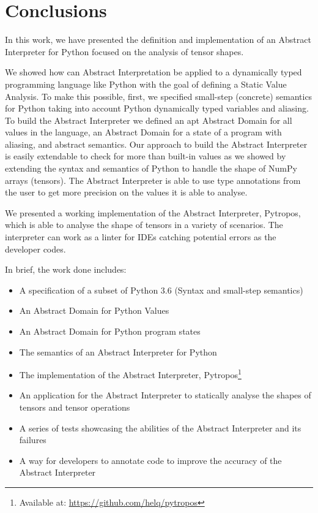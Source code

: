 \chapter{Conclusions}\label{conclusions}

In this work, we have presented the definition and implementation of an Abstract
Interpreter for Python focused on the analysis of tensor shapes.

We showed how can Abstract Interpretation be applied to a dynamically typed programming
language like Python with the goal of defining a Static Value Analysis. To make this
possible, first, we specified small-step (concrete) semantics for Python taking into
account Python dynamically typed variables and aliasing. To build the Abstract Interpreter
we defined an apt Abstract Domain for all values in the language, an Abstract Domain for a
state of a program with aliasing, and abstract semantics. Our approach to build the
Abstract Interpreter is easily extendable to check for more than built-in values as we
showed by extending the syntax and semantics of Python to handle the shape of NumPy arrays
(tensors). The Abstract Interpreter is able to use type annotations from the user to get
more precision on the values it is able to analyse.

We presented a working implementation of the Abstract Interpreter, Pytropos, which is able
to analyse the shape of tensors in a variety of scenarios. The interpreter can work as a
linter for IDEs catching potential errors as the developer codes.

In brief, the work done includes:

\begin{itemize}
\tightlist
\item A specification of a subset of Python 3.6 (Syntax and small-step semantics)
\item An Abstract Domain for Python Values
\item An Abstract Domain for Python program states
\item The semantics of an Abstract Interpreter for Python
\item The implementation of the Abstract Interpreter, Pytropos\footnote{Available at:
    \url{https://github.com/helq/pytropos}}
\item An application for the Abstract Interpreter to statically analyse the shapes of
  tensors and tensor operations
\item A series of tests showcasing the abilities of the Abstract Interpreter and its
  failures
\item A way for developers to annotate code to improve the accuracy of the Abstract
  Interpreter
\end{itemize}

